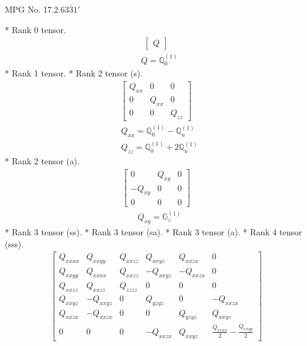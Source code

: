 \documentclass[fleqn,8pt,landscape]{jsarticle}
\begin{document}
\setcounter{MaxMatrixCols}{32}

\renewcommand{\tablename}{Table~}
\renewcommand{\figurename}{Figure~}
\begin{center}
\LARGE
MPG No. 17.2.63\quad$\bar{3}1'$
\end{center}
* Rank 0 tensor.
\begin{align*}
\begin{bmatrix} Q \end{bmatrix}
\end{align*}
\begin{align*}
& Q = \mathbb{Q}_{0}^{(1)}
\end{align*}
* Rank 1 tensor.
* Rank 2 tensor (s).
\begin{align*}
\begin{bmatrix} Q_{xx} & 0 & 0 \\ 0 & Q_{xx} & 0 \\ 0 & 0 & Q_{zz} \end{bmatrix}
\end{align*}
\begin{align*}
& Q_{xx} = \mathbb{Q}_{0}^{(1)} - \mathbb{Q}_{u}^{(1)} \\
& Q_{zz} = \mathbb{Q}_{0}^{(1)} + 2 \mathbb{Q}_{u}^{(1)}
\end{align*}
* Rank 2 tensor (a).
\begin{align*}
\begin{bmatrix} 0 & Q_{xy} & 0 \\ - Q_{xy} & 0 & 0 \\ 0 & 0 & 0 \end{bmatrix}
\end{align*}
\begin{align*}
& Q_{xy} = \mathbb{G}_{z}^{(1)}
\end{align*}
* Rank 3 tensor (ss).
* Rank 3 tensor (sa).
* Rank 3 tensor (a).
* Rank 4 tensor (sss).
\begin{align*}
\begin{bmatrix} Q_{xxxx} & Q_{xxyy} & Q_{xxzz} & Q_{xxyz} & Q_{xxzx} & 0 \\ Q_{xxyy} & Q_{xxxx} & Q_{xxzz} & - Q_{xxyz} & - Q_{xxzx} & 0 \\ Q_{xxzz} & Q_{xxzz} & Q_{zzzz} & 0 & 0 & 0 \\ Q_{xxyz} & - Q_{xxyz} & 0 & Q_{yzyz} & 0 & - Q_{xxzx} \\ Q_{xxzx} & - Q_{xxzx} & 0 & 0 & Q_{yzyz} & Q_{xxyz} \\ 0 & 0 & 0 & - Q_{xxzx} & Q_{xxyz} & \frac{Q_{xxxx}}{2} - \frac{Q_{xxyy}}{2} \end{bmatrix}
\end{align*}
\end{document}
